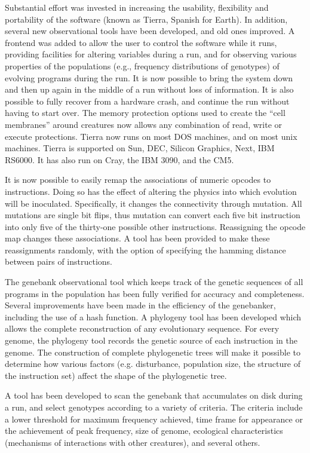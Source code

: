 Substantial effort was invested in increasing the usability, flexibility
and portability of the software (known as Tierra, Spanish for Earth).
In addition, several new observational tools have been developed, and old
ones improved.  A frontend was added to allow the user to control the software
while it runs, providing facilities for altering variables during a run, and
for observing various properties of the populations (e.g., frequency
distributions of genotypes) of evolving programs during the run.  It is now
possible to bring the system down and then up again in the middle of a run
without loss of information.  It is also possible to fully recover from a
hardware crash, and continue the run without having to start over.
The memory protection options used to create the ``cell membranes''
around creatures now allows any combination of read, write or execute
protections.  Tierra now runs on most DOS machines, and on most unix machines.
Tierra is supported on Sun, DEC, Silicon Graphics, Next, IBM RS6000.  It has
also run on Cray, the IBM 3090, and the CM5.

It is now possible to easily remap the associations of numeric opcodes to
instructions.  Doing so has the effect of altering the physics into which
evolution will be inoculated.  Specifically, it changes the connectivity
through mutation.  All mutations are single bit flips, thus mutation can
convert each five bit instruction into only five of the thirty-one possible
other instructions.  Reassigning the opcode map changes these associations.
A tool has been provided to make these reassignments randomly, with the
option of specifying the hamming distance between pairs of instructions.

The genebank observational tool which keeps track of the genetic sequences
of all programs in the population has been fully verified for accuracy and
completeness.  Several improvements have been made in the efficiency of the
genebanker, including the use of a hash function.  A phylogeny tool has
been developed which allows the complete reconstruction of any evolutionary
sequence.  For every genome, the phylogeny tool records the genetic source of
each instruction in the genome.  The construction of complete phylogenetic
trees will make it possible to determine how various factors (e.g.
disturbance, population size, the structure of the instruction set) affect
the shape of the phylogenetic tree.

A tool has been developed to scan the genebank that accumulates on disk
during a run, and select genotypes according to a variety of criteria.
The criteria include a lower threshold for maximum frequency achieved, time
frame for appearance or the achievement of peak frequency, size of genome,
ecological characteristics (mechanisms of interactions with other creatures),
and several others.

